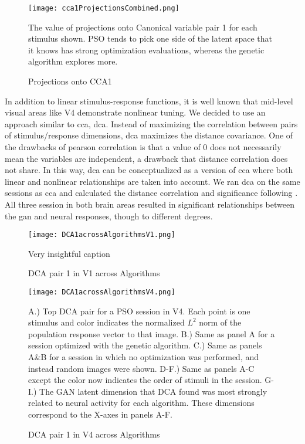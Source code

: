 \begin{figure}
	\centering
	\texttt{[image: cca1ProjectionsCombined.png]}
	\caption{Projections onto CCA1}{The value of projections onto Canonical variable pair 1 for each stimulus shown. PSO tends to pick one side of the latent space that it knows has strong optimization evaluations, whereas the genetic algorithm explores more.}
	\label{fig:ccaProjections}
\end{figure}

 In addition to linear stimulus-response functions, it is well known that mid-level visual areas like V4 demonstrate nonlinear tuning. We decided to use an approach similar to \gls{cca}, \gls{dca}. Instead of maximizing the correlation between pairs of stimulus/response dimensions, \gls{dca} maximizes the distance covariance. One of the drawbacks of pearson correlation is that a value of 0 does not necessarily mean the variables are independent, a drawback that distance correlation does not share. In this way, \gls{dca} can be conceptualized as a version of \gls{cca} where both linear and nonlinear relationships are taken into account. We ran \gls{dca} on the same sessions as \gls{cca} and calculated the distance correlation and significance following \cite{Shen2021}. All three session in both brain areas resulted in significant relationships between the \gls{gan} and neural responses, though to different degrees.
 
\begin{figure}
	\centering
	\texttt{[image: DCA1acrossAlgorithmsV1.png]}
	\caption{DCA pair 1 in V1 across Algorithms}{Very insightful caption}
	\label{fig:dca1V1}
\end{figure}


\begin{figure}
	\centering
	\texttt{[image: DCA1acrossAlgorithmsV4.png]}
	\caption{DCA pair 1 in V4 across Algorithms}{A.) Top DCA pair for a PSO session in V4. Each point is one stimulus and color indicates the normalized $L^2$ norm of the population response vector to that image. B.) Same as panel A for a session optimized with the genetic algorithm. C.) Same as panels A\&B for a session in which no optimization was performed, and instead random images were shown. D-F.) Same as panels A-C except the color now indicates the order of stimuli in the session. G-I.) The GAN latent dimension that DCA found was most strongly related to neural activity for each algorithm. These dimensions correspond to the X-axes in panels A-F.}
	\label{fig:dca1V4}
\end{figure}

